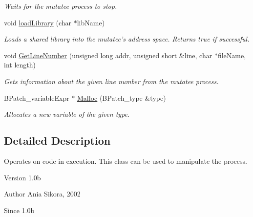 \begin{DoxyCompactItemize}
\begin{DoxyCompactList}\small\item\em Waits for the mutatee process to stop. \end{DoxyCompactList}\item 
void \hyperlink{class_di_process_a49c36844b4f223edb54b23e5bc3530d0}{load\-Library} (char $\ast$lib\-Name)
\begin{DoxyCompactList}\small\item\em Loads a shared library into the mutatee's address space. Returns true if successful. \end{DoxyCompactList}\item 
void \hyperlink{class_di_process_a3fabae8f482f0141effb044bd5550850}{Get\-Line\-Number} (unsigned long addr, unsigned short \&line, char $\ast$file\-Name, int length)
\begin{DoxyCompactList}\small\item\em Gets information about the given line number from the mutatee process. \end{DoxyCompactList}\item 
B\-Patch\-\_\-variable\-Expr $\ast$ \hyperlink{class_di_process_af5dbaaf631e3a3746bfa5878a46999e8}{Malloc} (B\-Patch\-\_\-type \&type)
\begin{DoxyCompactList}\small\item\em Allocates a new variable of the given type. \end{DoxyCompactList}\end{DoxyCompactItemize}


\subsection{Detailed Description}
Operates on code in execution. This class can be used to manipulate the process. 

\begin{DoxyVersion}{Version}
1.\-0b 
\end{DoxyVersion}
\begin{DoxyAuthor}{Author}
Ania Sikora, 2002 
\end{DoxyAuthor}
\begin{DoxySince}{Since}
1.\-0b 
\end{DoxySince}


